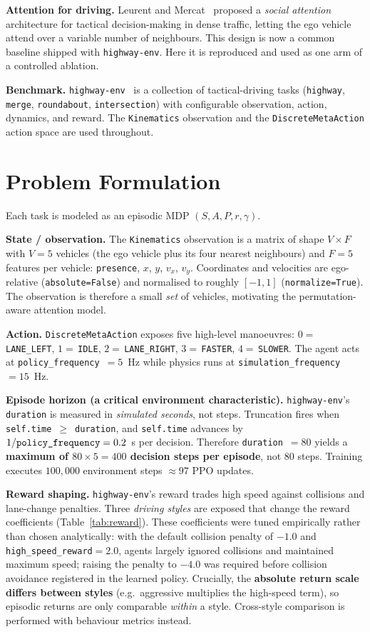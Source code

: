 \documentclass[conference]{IEEEtran}
\newcommand{\code}[1]{\texttt{#1}}
\begin{document}
\textbf{Attention for driving.} Leurent and Mercat~\cite{leurent2019social}
proposed a \emph{social attention} architecture for tactical decision-making in
dense traffic, letting the ego vehicle attend over a variable number of
neighbours. This design is now a common baseline shipped with \code{highway-env}.
Here it is reproduced and used as one arm of a controlled ablation.

\textbf{Benchmark.} \code{highway-env}~\cite{leurent2018environment} is a
collection of tactical-driving tasks (\code{highway}, \code{merge},
\code{roundabout}, \code{intersection}) with configurable observation, action,
dynamics, and reward. The \code{Kinematics} observation and the
\code{DiscreteMetaAction} action space are used throughout.

\section{Problem Formulation}
Each task is modeled as an episodic MDP $(S, A, P, r, \gamma)$.

\textbf{State / observation.} The \code{Kinematics} observation is a matrix of
shape $V \times F$ with $V = 5$ vehicles (the ego vehicle plus its four nearest
neighbours) and $F = 5$ features per vehicle:
\code{presence}, $x$, $y$, $v_x$, $v_y$. Coordinates and velocities are
ego-relative (\code{absolute=False}) and normalised to roughly $[-1, 1]$
(\code{normalize=True}). The observation is therefore a small \emph{set} of
vehicles, motivating the permutation-aware attention model.

\textbf{Action.} \code{DiscreteMetaAction} exposes five high-level manoeuvres:
$0=$\,\code{LANE\_LEFT}, $1=$\,\code{IDLE}, $2=$\,\code{LANE\_RIGHT},
$3=$\,\code{FASTER}, $4=$\,\code{SLOWER}. The agent acts at
\code{policy\_frequency}~$=5$~Hz while physics runs at
\code{simulation\_frequency}~$=15$~Hz.

\textbf{Episode horizon (a critical environment characteristic).}
\code{highway-env}'s \code{duration} is measured in \emph{simulated seconds},
not steps. Truncation fires when \code{self.time}~$\geq$~\code{duration}, and
\code{self.time} advances by $1/\text{\code{policy\_frequency}} = 0.2$~s per
decision. Therefore \code{duration}~$=80$ yields a \textbf{maximum of
$80 \times 5 = 400$ decision steps per episode}, not 80 steps. Training executes
$100{,}000$ environment steps $\approx 97$ PPO updates.

\textbf{Reward shaping.} \code{highway-env}'s reward trades high speed against
collisions and lane-change penalties. Three \emph{driving styles} are exposed
that change the reward coefficients (Table~\ref{tab:reward}). These coefficients
were tuned empirically rather than chosen analytically: with the default
collision penalty of $-1.0$ and \code{high\_speed\_reward}$=2.0$, agents largely
ignored collisions and maintained maximum speed; raising the penalty to $-4.0$
was required before collision avoidance registered in the learned policy.
Crucially, the \textbf{absolute return scale differs
between styles} (e.g.\ aggressive multiplies the high-speed term), so episodic
returns are only comparable \emph{within} a style. Cross-style comparison is
performed with behaviour metrics instead.
\end{document}
